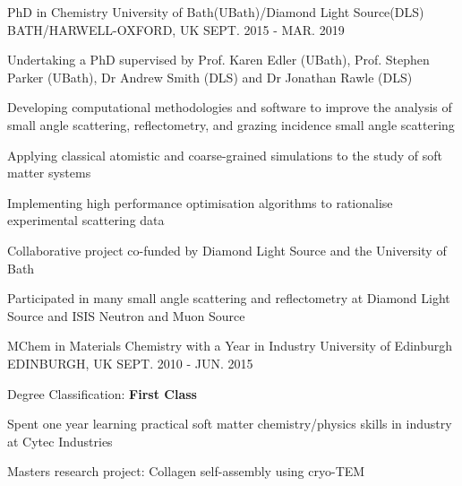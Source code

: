 \begin{cventries}
  \cventry
    {PhD in Chemistry}
    {University of Bath(UBath)/Diamond Light Source(DLS)}
    {BATH/HARWELL-OXFORD, UK}
    {SEPT. 2015 - MAR. 2019}
    {
      \begin{cvitems}
        \item {Undertaking a PhD supervised by Prof. Karen Edler (UBath), Prof. Stephen Parker (UBath), Dr Andrew Smith (DLS) and Dr Jonathan Rawle (DLS)}
        \item {Developing computational methodologies and software to improve the analysis of small angle scattering, reflectometry, and grazing incidence small angle scattering}
        \item {Applying classical atomistic and coarse-grained simulations to the study of soft matter systems}
        \item {Implementing high performance optimisation algorithms to rationalise experimental scattering data}
        \item {Collaborative project co-funded by Diamond Light Source and the University of Bath}
        \item {Participated in many small angle scattering and reflectometry at Diamond Light Source and ISIS Neutron and Muon Source}
      \end{cvitems}
    }
  \cventry
    {MChem in Materials Chemistry with a Year in Industry}
    {University of Edinburgh}
    {EDINBURGH, UK}
    {SEPT. 2010 - JUN. 2015}
    {
      \begin{cvitems}
        \item {Degree Classification: \textbf{First Class}}
        \item {Spent one year learning practical soft matter chemistry/physics skills in industry at Cytec Industries}
        \item {Masters research project: Collagen self-assembly using cryo-TEM}
      \end{cvitems}
    }
\end{cventries}
